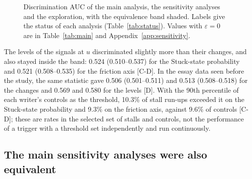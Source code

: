 \begin{figure}
  \caption{Discrimination AUC of the main analysis, the sensitivity analyses and the exploration, with the equivalence
  band shaded. Labels give the status of each analysis (Table~\ref{tab:status}). Values with $\varepsilon = 0$ are
  in Table~\ref{tab:main} and Appendix~\ref{app:sensitivity}.}
  \label{fig:forest}
\end{figure}

The levels of the signals at $u$ discriminated slightly more than their changes, and also stayed inside the band:
0.524 (0.510--0.537) for the Stuck-state probability and 0.521 (0.508--0.535) for the friction axis [C-D]. In the essay
data seen before the study, the same statistic gave 0.506 (0.501--0.511) and 0.513 (0.508--0.518) for the changes and
0.569 and 0.580 for the levels [D]. With the 90th percentile of each writer's controls as the threshold, 10.3\% of stall
run-ups exceeded it on the Stuck-state probability and 9.3\% on the friction axis, against 9.6\% of controls [C-D]; these
are rates in the selected set of stalls and controls, not the performance of a trigger with a threshold set
independently and run continuously.

\subsection{The main sensitivity analyses were also equivalent}

